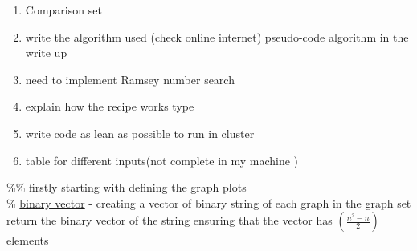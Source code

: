 \documentclass{Assignment}
\begin{document}
\begin{enumerate}
	\item Comparison set
	\item write the algorithm used (check online internet) pseudo-code algorithm in the write up
	\item need to implement Ramsey number search 
	\item explain how the recipe works type 
	\item write code as lean as possible to run in cluster
	\item table for different inputs(not complete in my machine )
\end{enumerate}
\%\% firstly starting with defining the graph plots\\
\% \underline{binary vector} - creating a vector of binary string of each graph in the graph set return the binary vector of the string ensuring that the vector has $\left(\frac{n^2-n}{2}\right)$ elements\\\\
\end{document}
